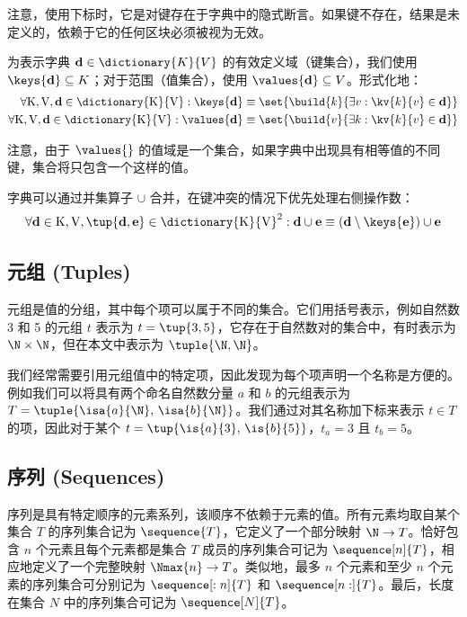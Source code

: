 注意，使用下标时，它是对键存在于字典中的隐式断言。如果键不存在，结果是未定义的，依赖于它的任何区块必须被视为无效。

为表示字典 $\mathbf{d} \in \dictionary{K}{V}$ 的有效定义域（\ie 键集合），我们使用 $\keys{\mathbf{d}} \subseteq K$；对于范围（\ie 值集合），使用 $\values{\mathbf{d}} \subseteq V$。形式化地：
\begin{align}
  \forall \mathrm{K}, \mathrm{V}, \mathbf{d} \in \dictionary{\mathrm{K}}{\mathrm{V}} : \keys{\mathbf{d}} &\equiv \set{\build{k}{\exists v : \kv{k}{v} \in \mathbf{d}}} \\
  \forall \mathrm{K}, \mathrm{V}, \mathbf{d} \in \dictionary{\mathrm{K}}{\mathrm{V}} : \values{\mathbf{d}} &\equiv \set{\build{v}{\exists k : \kv{k}{v} \in \mathbf{d}}}
\end{align}

注意，由于 $\values{}$ 的值域是一个集合，如果字典中出现具有相等值的不同键，集合将只包含一个这样的值。

字典可以通过并集算子 $\cup$ 合并，在键冲突的情况下优先处理右侧操作数：
\begin{equation}
  \forall \mathbf{d} \in \mathrm{K}, \mathrm{V}, \tup{\mathbf{d}, \mathbf{e}} \in \dictionary{\mathrm{K}}{\mathrm{V}}^2 : \mathbf{d} \cup \mathbf{e} \equiv (\mathbf{d} \setminus \keys{\mathbf{e}}) \cup \mathbf{e}
\end{equation}

\subsection{元组 (Tuples)}\label{sec:tuples}

元组是值的分组，其中每个项可以属于不同的集合。它们用括号表示，例如自然数 3 和 5 的元组 $t$ 表示为 $t = \tup{3, 5}$，它存在于自然数对的集合中，有时表示为 $\N \times \N$，但在本文中表示为 $\tuple{\N, \N}$。

我们经常需要引用元组值中的特定项，因此发现为每个项声明一个名称是方便的。例如我们可以将具有两个命名自然数分量 $a$ 和 $b$ 的元组表示为 $T = \tuple{\isa{a}{\N},\,\isa{b}{\N}}$。我们通过对其名称加下标来表示 $t \in T$ 的项，因此对于某个 $t = \tup{\is{a}{3},\,\is{b}{5}}$，$t_{a} = 3$ 且 $t_{b} = 5$。

\subsection{序列 (Sequences)}\label{sec:sequences}

序列是具有特定顺序的元素系列，该顺序不依赖于元素的值。所有元素均取自某个集合 $T$ 的序列集合记为 $\sequence{T}$，它定义了一个部分映射 $\N \to T$。恰好包含 $n$ 个元素且每个元素都是集合 $T$ 成员的序列集合可记为 $\sequence[n]{T}$，相应地定义了一个完整映射 $\Nmax{n} \to T$。类似地，最多 $n$ 个元素和至少 $n$ 个元素的序列集合可分别记为 $\sequence[:n]{T}$ 和 $\sequence[n:]{T}$。最后，长度在集合 $N$ 中的序列集合可记为 $\sequence[N]{T}$。

